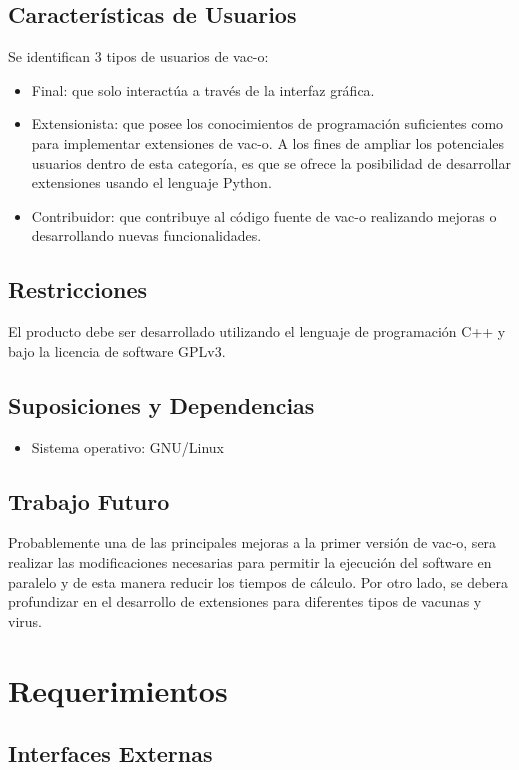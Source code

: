\documentclass[10pt,a4paper]{article}
\begin{document}
  \subsection{Caracter\'isticas de Usuarios}
  Se identifican 3 tipos de usuarios de vac-o:
  \begin{itemize}
    \item Final: que solo interact\'ua a trav\'es de la interfaz gr\'afica.
    \item Extensionista: que posee los conocimientos de programaci\'on suficientes como para implementar extensiones de vac-o. A los fines de ampliar los potenciales usuarios dentro de esta categor\'ia, es que se ofrece la posibilidad de desarrollar extensiones usando el lenguaje Python.
    \item Contribuidor: que contribuye al c\'odigo fuente de vac-o realizando mejoras o desarrollando nuevas funcionalidades.
  \end{itemize}

  \subsection{Restricciones}
  El producto debe ser desarrollado utilizando el lenguaje de programaci\'on C++ y bajo la licencia de software GPLv3.
  
  \subsection{Suposiciones y Dependencias}
    \begin{itemize}
      \item Sistema operativo: GNU/Linux
    \end{itemize}
  
  \subsection{Trabajo Futuro}
  Probablemente una de las principales mejoras a la primer versi\'on de vac-o, sera realizar las modificaciones necesarias para permitir la ejecuci\'on del software en paralelo y de esta manera reducir los tiempos de c\'alculo. 
  Por otro lado, se debera profundizar en el desarrollo de extensiones para diferentes tipos de vacunas y virus.
  

\section{Requerimientos}
  \label{section-req}
  \subsection{Interfaces Externas}
\end{document}

